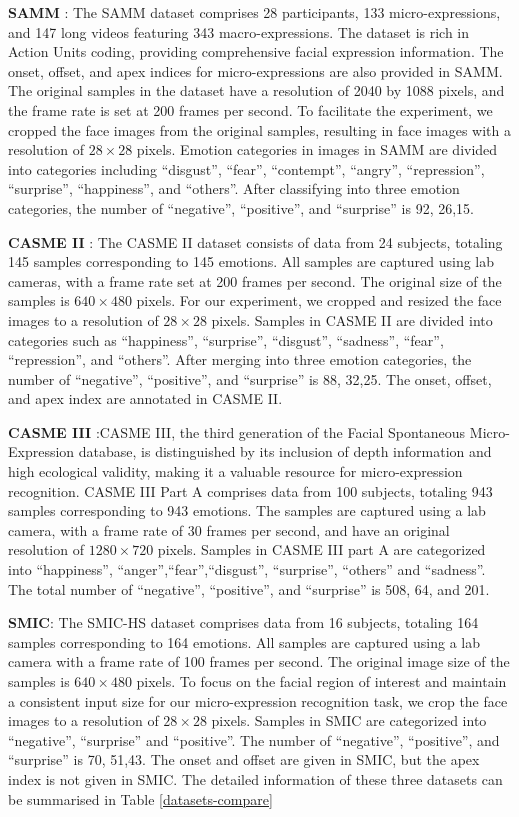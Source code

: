 \documentclass[review,12pt, 3p]{elsarticle}
\begin{document}
\textbf{SAMM} \cite{ref-48}: The SAMM dataset comprises 28 participants, 133 micro-expressions, and 147 long videos featuring 343 macro-expressions. The dataset is rich in Action Units coding, providing comprehensive facial expression information. The onset, offset, and apex indices for micro-expressions are also provided in SAMM. The original samples in the dataset have a resolution of 2040 by 1088 pixels, and the frame rate is set at 200 frames per second. To facilitate the experiment, we cropped the face images from the original samples, resulting in face images with a resolution of $28 \times 28$ pixels. Emotion categories in images in SAMM are divided into categories including ``disgust'', ``fear'', ``contempt'', ``angry'', ``repression'', ``surprise'', ``happiness'', and ``others''. After classifying into three emotion categories, the number of ``negative'', ``positive'', and ``surprise'' is 92, 26,15. 

\textbf{CASME II} \cite{ref-50}: The CASME II dataset consists of data from 24 subjects, totaling 145 samples corresponding to 145 emotions. All samples are captured using lab cameras, with a frame rate set at 200 frames per second. The original size of the samples is $640 \times 480$ pixels. For our experiment, we cropped and resized the face images to a resolution of $28 \times 28$ pixels. Samples in CASME II are divided into categories such as ``happiness'', ``surprise'', ``disgust'', ``sadness'', ``fear'', ``repression'', and ``others''. After merging into three emotion categories, the number of ``negative'', ``positive'', and ``surprise'' is 88, 32,25. The onset, offset, and apex index are annotated in CASME II. 

\textbf{CASME III} \cite{ref-51}:CASME III, the third generation of the Facial Spontaneous Micro-Expression database, is distinguished by its inclusion of depth information and high ecological validity, making it a valuable resource for micro-expression recognition. CASME III Part A comprises data from 100 subjects, totaling 943 samples corresponding to 943 emotions. The samples are captured using a lab camera, with a frame rate of 30 frames per second, and have an original resolution of $1280 \times 720$ pixels. Samples in CASME III part A are categorized into ``happiness'',  ``anger'',``fear'',``disgust'',   ``surprise'', ``others'' and ``sadness''. The total number of ``negative'', ``positive'', and ``surprise'' is 508, 64, and 201. 

\textbf{SMIC}\cite{ref-49}: The SMIC-HS dataset comprises data from 16 subjects, totaling 164 samples corresponding to 164 emotions. All samples are captured using a lab camera with a frame rate of 100 frames per second. The original image size of the samples is $640 \times 480$ pixels. To focus on the facial region of interest and maintain a consistent input size for our micro-expression recognition task, we crop the face images to a resolution of $28 \times 28$ pixels. Samples in SMIC are categorized into ``negative'', ``surprise'' and ``positive''. The number of ``negative'', ``positive'', and ``surprise'' is 70, 51,43. The onset and offset are given in SMIC, but the apex index is not given in SMIC. The detailed information of these three datasets can be summarised in Table \ref{datasets-compare}
\end{document}
